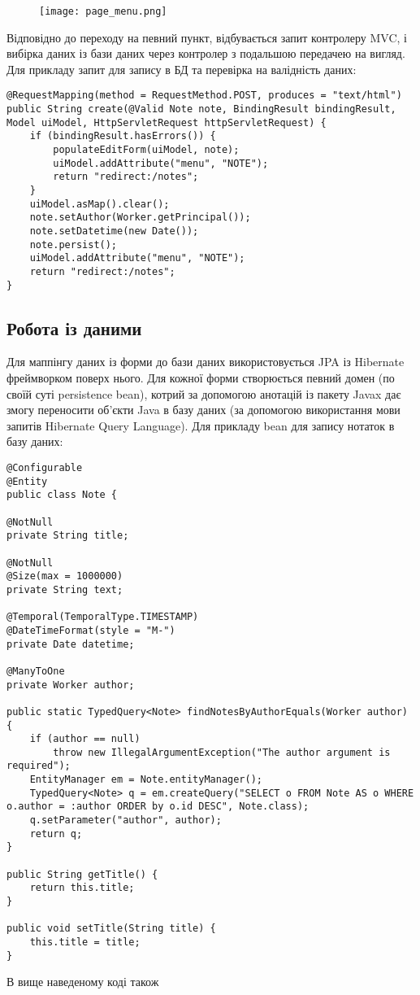 \begin{figure}[!ht]
\centering
    \texttt{[image: page\_menu.png]}
    \label{pic:page_menu}
\end{figure}
\par Відповідно до переходу на певний пункт, відбувається запит контролеру MVC, і вибірка даних із бази даних через контролер з подальшою передачею на вигляд. Для прикладу запит для запису в БД та перевірка на валідність даних:
\begin{lstlisting}
@RequestMapping(method = RequestMethod.POST, produces = "text/html")
public String create(@Valid Note note, BindingResult bindingResult, Model uiModel, HttpServletRequest httpServletRequest) {
    if (bindingResult.hasErrors()) {
        populateEditForm(uiModel, note);
        uiModel.addAttribute("menu", "NOTE");
        return "redirect:/notes";
    }
    uiModel.asMap().clear();
    note.setAuthor(Worker.getPrincipal());
    note.setDatetime(new Date());
    note.persist();
    uiModel.addAttribute("menu", "NOTE");
    return "redirect:/notes";
}
\end{lstlisting}


\subsection{Робота із даними}
\par Для маппінгу даних із форми до бази даних використовується JPA із Hibernate фреймворком поверх нього. Для кожної форми створюється певний домен (по своїй суті persistence bean), котрий за допомогою анотацій із пакету Javax дає змогу переносити об'єкти Java в базу даних (за допомогою використання мови запитів Hibernate Query Language). Для прикладу bean для запису нотаток в базу даних:
\begin{lstlisting} 
@Configurable
@Entity
public class Note {

@NotNull
private String title;

@NotNull
@Size(max = 1000000)
private String text;

@Temporal(TemporalType.TIMESTAMP)
@DateTimeFormat(style = "M-")
private Date datetime;

@ManyToOne
private Worker author;

public static TypedQuery<Note> findNotesByAuthorEquals(Worker author) {
    if (author == null)
        throw new IllegalArgumentException("The author argument is required");
    EntityManager em = Note.entityManager();
    TypedQuery<Note> q = em.createQuery("SELECT o FROM Note AS o WHERE o.author = :author ORDER by o.id DESC", Note.class);
    q.setParameter("author", author);
    return q;
}

public String getTitle() {
    return this.title;
}

public void setTitle(String title) {
    this.title = title;
}
\end{lstlisting}
\par В вище наведеному коді також 


